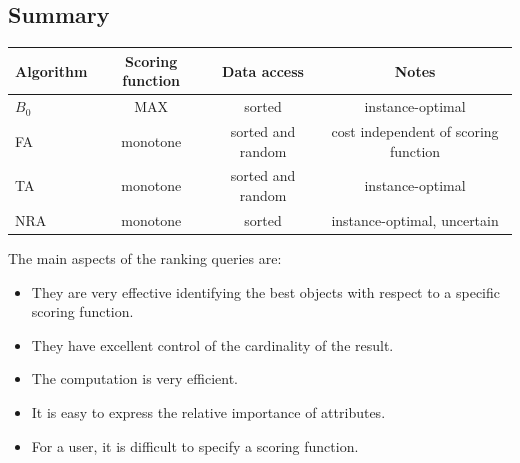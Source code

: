\documentclass[12pt, a4paper]{report}
\begin{document}
    \subsection{Summary}
    \begin{table}[H]
        \centering
        \begin{tabular}{l|ccc}
        \multicolumn{1}{c|}{\textbf{Algorithm}} & \textbf{Scoring function} & \textbf{Data access} & \textbf{Notes}                       \\ \hline
        $B_0$                                   & MAX                       & sorted               & instance-optimal                     \\
        FA                                      & monotone                  & sorted and random    & cost independent of scoring function \\
        TA                                      & monotone                  & sorted and random    & instance-optimal                     \\
        NRA                                     & monotone                  & sorted               & instance-optimal, uncertain         
        \end{tabular}
    \end{table}

    The main aspects of the ranking queries are: 
    \begin{itemize}
        \item They are very effective identifying the best objects with respect to a specific scoring function. 
        \item They have excellent control of the cardinality of the result. 
        \item The computation is very efficient. 
        \item It is easy to express the relative importance of attributes. 
        \item For a user, it is difficult to specify a scoring function. 
    \end{itemize}
\end{document}
